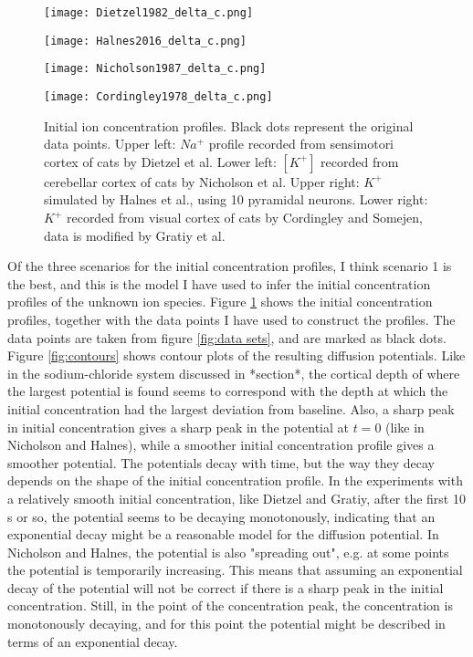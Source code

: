 \documentclass{article}
\begin{document}
\begin{figure}[!tbp]
  \centering
  \begin{minipage}[b]{0.45\textwidth}
    \texttt{[image: Dietzel1982\_delta\_c.png]}
  \end{minipage}
  \hfill
  \begin{minipage}[b]{0.45\textwidth}
    \texttt{[image: Halnes2016\_delta\_c.png]}
  \end{minipage}
    \begin{minipage}[b]{0.45\textwidth}
    \texttt{[image: Nicholson1987\_delta\_c.png]}
  \end{minipage}
  \hfill
  \begin{minipage}[b]{0.45\textwidth}
    \texttt{[image: Cordingley1978\_delta\_c.png]}
  \end{minipage}
  \caption{Initial ion concentration profiles. Black dots represent the original data points. Upper left: $Na^+$ profile recorded from sensimotori cortex of cats by Dietzel et al. Lower left: $[K^+]$  recorded from cerebellar cortex of cats by Nicholson et al. Upper right:  $K^+$ simulated by Halnes et al., using 10 pyramidal neurons. Lower right: $K^+$ recorded from visual cortex of cats by Cordingley and Somejen, data is modified by Gratiy et al.}
  \label{fig:initial concentrations}
\end{figure} 
Of the three scenarios for the initial concentration profiles, I think scenario 1 is the best, and this is the model I have used to infer the initial concentration profiles of the unknown ion species. Figure \ref{fig:initial concentrations} shows the initial concentration profiles, together with the data points I have used to construct the profiles. The data points are taken from figure \ref{fig:data sets}, and are marked as black dots. Figure \ref{fig:contours} shows contour plots of the resulting diffusion potentials. Like in the sodium-chloride system discussed in *section*, the cortical depth of where the largest potential is found seems to correspond with the depth at which the initial concentration had the largest deviation from baseline. Also, a sharp peak in initial concentration gives a sharp peak in the potential at $t=0$ (like in Nicholson and Halnes), while a smoother initial concentration profile gives a smoother potential. The potentials decay with time, but the way they decay depends on the shape of the initial concentration profile. In the experiments with a relatively smooth initial concentration, like Dietzel and Gratiy, after the first 10 s or so, the potential seems to be decaying monotonously, indicating that an exponential decay might be a reasonable model for the diffusion potential. In Nicholson and Halnes, the potential is also "spreading out", e.g. at some points the potential is temporarily increasing. This means that assuming an exponential decay of the potential will not be correct if there is a sharp peak in the initial concentration. Still, in the point of the concentration peak, the concentration is monotonously decaying, and for this point the potential might be described in terms of an exponential decay. 
\end{document}
